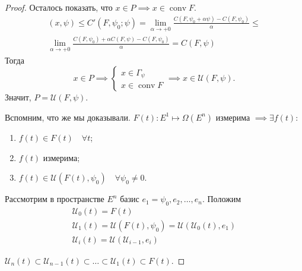 \begin{proof}
    Осталось показать, что $x \in P \implies x \in \operatorname{conv}F$.
    \begin{gather*}
        (x, \psi) \leqslant C'(F, \psi_0; \psi) = 
        \lim\limits_{\alpha \to +0} \frac{C(F, \psi_0 + \alpha \psi) - C(F, \psi_0)}{\alpha} \leqslant \\
        \lim\limits_{\alpha \to +0} \frac{C(F, \psi_0) + \alpha C(F, \psi) - C(F, \psi_0)}{\alpha} =
        C(F, \psi)
    \end{gather*}
    Тогда
    \begin{equation*}
        x \in P \implies \begin{cases}
            x \in \Gamma_\psi \\
            x \in \operatorname{conv} F
        \end{cases} \implies x \in \mathcal{U}(F, \psi).
    \end{equation*}
    Значит, $P = \mathcal{U}(F, \psi)$.

    \bigskip
    Вспомним, что же мы доказывали.
    $F(t)\colon E^1 \mapsto \Omega(E^n)$ измерима $\implies \exists f(t)\colon$
    \begin{enumerate}
        \item $f(t) \in F(t) \quad \forall t$;
        \item $f(t)$ измерима;
        \item $f(t) \in \mathcal{U}(F(t), \psi_0) \quad \forall \psi_0 \neq 0$.
    \end{enumerate}

    Рассмотрим в пространстве $E^n$ базис $e_1 = \psi_0, e_2, \ldots, e_n$. Положим
    \begin{gather*}
        \mathcal{U}_0(t) = F(t) \\
        \mathcal{U}_1(t) = \mathcal{U}(F(t), \psi_0) = \mathcal{U}(\mathcal{U}_0(t), e_1) \\
        \mathcal{U}_i(t) = \mathcal{U}(\mathcal{U}_{i-1}, e_i)
    \end{gather*}

    $\mathcal{U}_n(t) \subset \mathcal{U}_{n-1}(t) \subset \ldots \subset \mathcal{U}_1(t) \subset F(t)$.
    

\end{proof}
